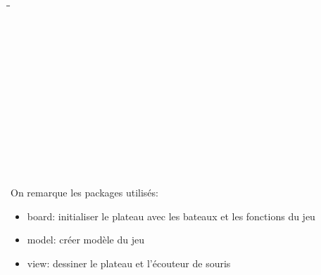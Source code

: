 \documentclass[12pt, pdflatex]{article}
\begin{document}
    \begin{minipage}{\textwidth}
        \begin{tabbing}
        \hspace{1em}\=\hspace{1em}\=\hspace{1em}\=\hspace{12em}\=\\\kill

         \>\>\>\> \\

         \>\>\>\> \\
        
         \>\>\>\> \+\\
           \>\>\>   \+\\
             \>\> \-\\

           \>\>\>  \+\\
             \>\> \\
             \>\>  \-\\

           \>\>\>  \+\\
             \>\> \-\\

           \>\>\>  \\

        \end{tabbing}
        \end{minipage}
        \par
        On remarque les packages utilisés:
        \begin{itemize}
            \item board: initialiser le plateau avec les bateaux et les fonctions du jeu
            \item model: créer modèle du jeu
            \item view: dessiner le plateau et l'écouteur de souris
        \end{itemize}

    
\end{document}
